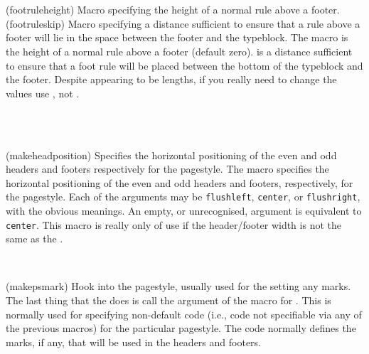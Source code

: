 \begin{plainlist}
\begin{syntax}
\cmd{\footruleheight} \\
\cmd{\footruleskip} \\
\end{syntax}
\glossary(footruleheight)%
  {}%
  {Macro specifying the height of a normal rule above a footer.}
\glossary(footruleskip)%
  {}%
  {Macro specifying a distance sufficient to ensure that a rule above a footer
   will lie in the space between the footer and the typeblock.}
The macro \cmd{\footruleheight} is the height of a normal
rule above a footer (default zero). 
\cmd{\footruleskip} is a distance 
sufficient to ensure that a foot rule will be placed between the bottom
of the typeblock and the footer. 
Despite appearing to be lengths, if you really need to change the values 
use \cmd{\renewcommand}, not \cmd{\setlength}.

\begin{syntax}
\cmd{\makeheadposition}\\
     \\
\end{syntax}
\glossary(makeheadposition)%
  {}%
  {Specifies the horizontal positioning of the even and odd headers and
   footers respectively for the  pagestyle.}
The \cmd{\makeheadposition} macro specifies the horizontal positioning
of the even and odd headers and footers, 
respectively, for the  pagestyle. 
Each of the  arguments may be \texttt{flushleft}, \texttt{center},
or \texttt{flushright}, with the obvious meanings. An empty, or unrecognised, 
argument is equivalent to \texttt{center}. This macro is really only of use 
if the header/footer width is not the 
same as the \lnc{\textwidth}.

\begin{syntax}
\cmd{\makepsmarks} \\
\end{syntax}
\glossary(makepsmark)
  {}%
  {Hook into the  pagestyle, usually used for the 
   setting any marks.}
The last thing that the \cmd{\pagestyle} does is call the
 argument of the \cmd{\makepsmarks} macro for .
This is normally used for specifying non-default code 
(i.e., code not specifiable via any of the previous macros) for the 
particular pagestyle. The code normally defines the marks, if any, 
that will be used in
the headers and footers.


\end{plainlist}

